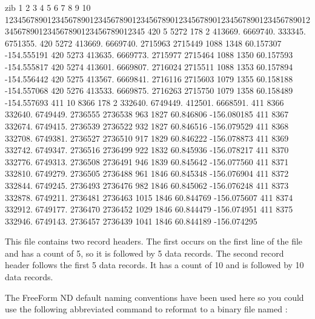 \begin{vcode}{zib}
         1         2         3         4         5         6         7         8         9         10
123456789012345678901234567890123456789012345678901234567890123456789012345678901234567890123456789012345
  420       5     5272     178       2   413669.  6669740.   333345.  6751355.                       
  420      5272   413669.  6669740.   2715963   2715449      1088      1348        60.157307 -154.555191
  420      5273   413635.  6669773.   2715977   2715464      1088      1350        60.157593 -154.555817
  420      5274   413601.  6669807.   2716024   2715511      1088      1353        60.157894 -154.556442
  420      5275   413567.  6669841.   2716116   2715603      1079      1355        60.158188 -154.557068
  420      5276   413533.  6669875.   2716263   2715750      1079      1358        60.158489 -154.557693
  411      10     8366     178       2   332640.  6749449.   412501.  6668591.                         
  411      8366   332640.  6749449.   2736555   2736538       963      1827        60.846806 -156.080185
  411      8367   332674.  6749415.   2736539   2736522       932      1827        60.846516 -156.079529
  411      8368   332708.  6749381.   2736527   2736510       917      1829        60.846222 -156.078873
  411      8369   332742.  6749347.   2736516   2736499       922      1832        60.845936 -156.078217
  411      8370   332776.  6749313.   2736508   2736491       946      1839        60.845642 -156.077560
  411      8371   332810.  6749279.   2736505   2736488       961      1846        60.845348 -156.076904
  411      8372   332844.  6749245.   2736493   2736476       982      1846        60.845062 -156.076248
  411      8373   332878.  6749211.   2736481   2736463      1015      1846        60.844769 -156.075607
  411      8374   332912.  6749177.   2736470   2736452      1029      1846        60.844479 -156.074951
  411      8375   332946.  6749143.   2736457   2736439      1041      1846        60.844189 -156.074295 
\end{vcode}

This file contains two record headers. The first occurs on the first
line of the file and has a count of 5, so it is followed by 5 data
records. The second record header follows the first 5 data records. It
has a count of 10 and is followed by 10 data records.

The FreeForm ND default naming conventions have been used here so you
could use the following abbreviated command to reformat
 to a binary file named :

